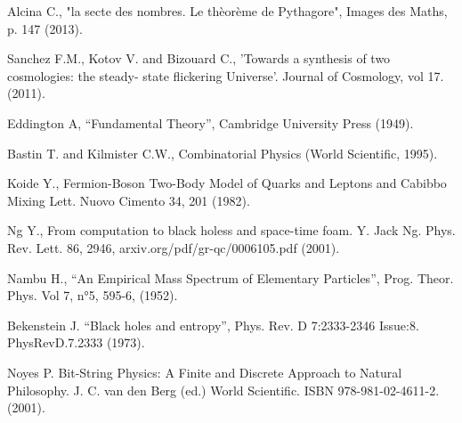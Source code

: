 \documentclass[a4paper,9pt]{article}
\begin{document}
\begin{thebibliography}{99}
 Alcina C., "la secte des nombres. Le thèorème de Pythagore", Images des Maths, p. 147 (2013).


 Sanchez F.M., Kotov V. and Bizouard C., 'Towards a synthesis of two cosmologies: the steady- state flickering Universe'. Journal of Cosmology, vol 17. (2011).

 Eddington A, ``Fundamental Theory'', Cambridge University Press (1949).





 Bastin T. and Kilmister C.W., Combinatorial Physics (World Scientific, 1995).

 Koide Y., Fermion-Boson Two-Body Model of Quarks and Leptons and Cabibbo Mixing  Lett. Nuovo Cimento 34, 201 (1982).

 Ng Y., From computation to black holess and space-time foam. Y. Jack Ng. Phys. Rev. Lett. 86, 2946, arxiv.org/pdf/gr-qc/0006105.pdf (2001).

 Nambu H., “An Empirical Mass Spectrum of Elementary Particles”, Prog. Theor. Phys. Vol 7, n°5, 595-6, (1952).








 Bekenstein J. ``Black holes and entropy'', Phys. Rev. D 7:2333-2346 Issue:8. PhysRevD.7.2333 (1973).

 Noyes P. Bit-String Physics: A Finite and Discrete Approach to Natural Philosophy. J. C. van den Berg (ed.) World Scientific. ISBN 978-981-02-4611-2. (2001).







\end{thebibliography}
\end{document}
